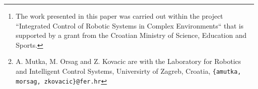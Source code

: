 
\author{Alan Mutka, Matko Orsag, and Zdenko Kovacic%
\thanks{The work presented in this paper was carried out within the project “Integrated Control of Robotic Systems in Complex Environments“ that is supported by a grant from the Croatian Ministry of Science, Education and Sports.}%
\thanks{A. Mutka, M. Orsag and Z. Kovacic are with the Laboratory for Robotics and Intelligent Control Systems, Universirty of Zagreb, Croatia, {\tt\small\{amutka, morsag, zkovacic\}{@}fer.hr}}
}